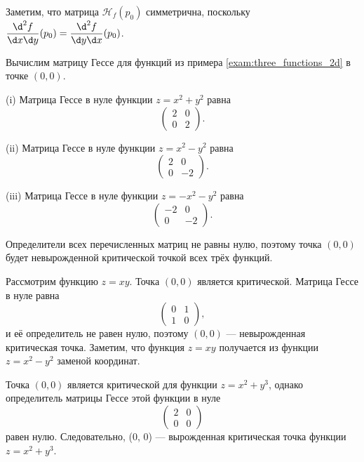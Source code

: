 \documentclass[a4paper,12pt,openany,leqno]{extbook}
\begin{document}
    Заметим, что матрица $\mathcal{H}_f(p_0)$ симметрична, поскольку $\dfrac{\d^2 f}{\d x \d y}(p_0) = \dfrac{\d^2 f}{\d y \d x}(p_0)$.
    
    \begin{example}
    Вычислим матрицу Гессе для функций из примера \ref{exam:three_functions_2d} в точке $(0, 0)$.
    
    (i) Матрица Гессе в нуле функции $z = x^2 + y^2$  равна
    \[
    \left(
  \begin{array}{cc}
    2 & 0\\
    0 & 2
  \end{array}
    \right).
    \]
    
    (ii) Матрица Гессе в нуле функции $z = x^2 - y^2$  равна
    \[
    \left(
  \begin{array}{cc}
    2 & 0\\
    0 & -2
  \end{array}
    \right).
    \]
    
    (iii) Матрица Гессе в нуле функции $z = -x^2 - y^2$  равна
    \[
    \left(
  \begin{array}{cc}
    -2 & 0\\
    0 & -2
  \end{array}
    \right).
    \]
    
    Определители всех перечисленных матриц не равны нулю, поэтому точка $(0, 0)$ будет невырожденной критической точкой всех трёх функций.
    
    \label{exam:three_function_hessians}
    \end{example}
    
    \begin{example}
    Рассмотрим функцию $z = xy$. Точка $(0, 0)$ является критической. Матрица Гессе в нуле равна 
    \[
    \left(
  \begin{array}{cc}
    0 & 1\\
    1 & 0
  \end{array}
    \right),
    \]
    и её определитель не равен нулю, поэтому $(0, 0)$ --- невырожденная критическая точка. Заметим, что функция $z = xy$ получается из функции $z = x^2 - y^2$ заменой координат.
    \label{exam:z_xy}
    \end{example}
    
    \begin{example}
    Точка $(0, 0)$ является критической для функции $z = x^2 + y^3$, однако определитель матрицы Гессе этой функции в нуле
    \[
    \left(
  \begin{array}{cc}
    2 & 0\\
    0 & 0
  \end{array}
    \right)
    \]
    равен нулю. Следовательно, (0, 0) --- вырожденная критическая точка функции $z = x^2 + y^3$.
    \end{example}
    
\end{document}
